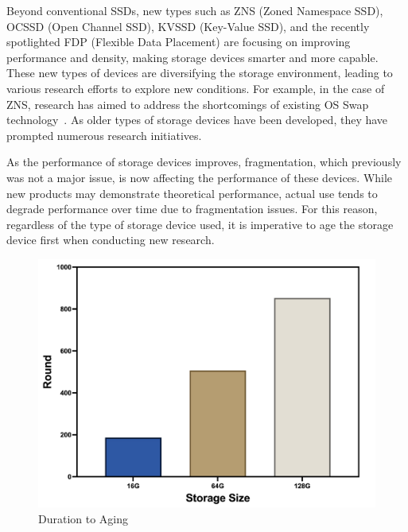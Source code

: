 Beyond conventional SSDs, new types such as ZNS (Zoned Namespace SSD), OCSSD (Open Channel SSD), KVSSD (Key-Value SSD), and the recently spotlighted FDP (Flexible Data Placement) are focusing on improving performance and density, making storage devices smarter and more capable.
These new types of devices are diversifying the storage environment, leading to various research efforts to explore new conditions.
For example, in the case of ZNS, research has aimed to address the shortcomings of existing OS Swap technology~\cite{znswap}.
As older types of storage devices have been developed, they have prompted numerous research initiatives.

As the performance of storage devices improves, fragmentation, which previously was not a major issue, is now affecting the performance of these devices.
While new products may demonstrate theoretical performance, actual use tends to degrade performance over time due to fragmentation issues.
For this reason, regardless of the type of storage device used, it is imperative to age the storage device first when conducting new research.


\begin{figure}[t]
    \centering
    \includegraphics[width=0.95\columnwidth]{graphs/aging_duration}
    \caption{Duration to Aging}
    \label{fig:aging-duration}
\end{figure}


